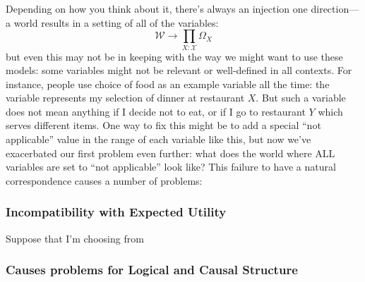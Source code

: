 \documentclass{article}
\begin{document}
	Depending on how you think about it, there's always an injection one direction--- a world results in a setting of all of the variables:
	\[ \mathcal W \to \prod_{X: \mathcal X} \Omega_X \] 
	but even this may not be in keeping with the way we might want to use these models: some variables might not be relevant or well-defined in all contexts. For instance, people use choice of food as an example variable all the time: the variable represents my selection of dinner at restaurant $X$. But such a variable does not mean anything if I decide not to eat, or if I go to restaurant $Y$ which serves different items. One way to fix this might be to add a special ``not applicable'' value in the range of each variable like this, but now we've exacerbated our first problem even further: what does the world where ALL variables are set to ``not applicable'' look like? This failure to have a natural correspondence causes a number of problems:
	
	\subsubsection{Incompatibility with Expected Utility}
	
	Suppose that I'm choosing from 
	
	\subsubsection{Causes problems for Logical and Causal Structure}
	
\end{document}
